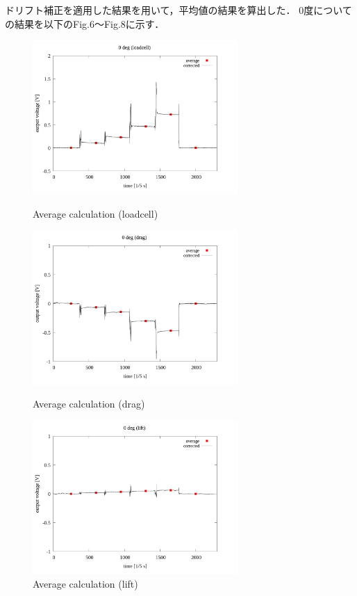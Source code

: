 \documentclass[twocolumn,a4j]{jsarticle}
\begin{document}
ドリフト補正を適用した結果を用いて，平均値の結果を算出した．
0度についての結果を以下のFig.6～Fig.8に示す．

\begin{figure}[htbp]
    \footnotesize
    \begin{center}
        \includegraphics[width=78mm]{../images/average/0_loadcell_average.png}
        \caption{Average calculation (loadcell)}
        \includegraphics[width=78mm]{../images/average/0_drag_average.png}
        \caption{Average calculation (drag)}
        \includegraphics[width=78mm]{../images/average/0_lift_average.png}
        \caption{Average calculation (lift)}
    \end{center}
\end{figure}
\newpage
\end{document}

